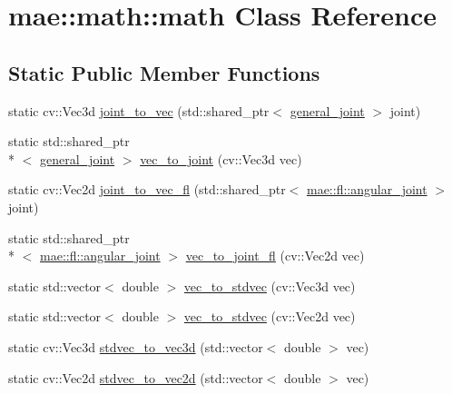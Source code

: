 \hypertarget{classmae_1_1math_1_1math}{\section{mae\-:\-:math\-:\-:math Class Reference}
\label{classmae_1_1math_1_1math}
}
\subsection*{Static Public Member Functions}
\begin{DoxyCompactItemize}
\item 
static cv\-::\-Vec3d \hyperlink{classmae_1_1math_1_1math_a69d06a0e584bf1d872d26a4fd2db37f0}{joint\-\_\-to\-\_\-vec} (std\-::shared\-\_\-ptr$<$ \hyperlink{classmae_1_1general__joint}{general\-\_\-joint} $>$ joint)
\item 
static std\-::shared\-\_\-ptr\\*
$<$ \hyperlink{classmae_1_1general__joint}{general\-\_\-joint} $>$ \hyperlink{classmae_1_1math_1_1math_a8a1e0a8ab6f487a3fa8ee69af6fc798b}{vec\-\_\-to\-\_\-joint} (cv\-::\-Vec3d vec)
\item 
static cv\-::\-Vec2d \hyperlink{classmae_1_1math_1_1math_a9c06acbeefcc43a217df33d0dd4f1611}{joint\-\_\-to\-\_\-vec\-\_\-fl} (std\-::shared\-\_\-ptr$<$ \hyperlink{classmae_1_1fl_1_1angular__joint}{mae\-::fl\-::angular\-\_\-joint} $>$ joint)
\item 
static std\-::shared\-\_\-ptr\\*
$<$ \hyperlink{classmae_1_1fl_1_1angular__joint}{mae\-::fl\-::angular\-\_\-joint} $>$ \hyperlink{classmae_1_1math_1_1math_aa56f27d38991dd723a80e61901c74c01}{vec\-\_\-to\-\_\-joint\-\_\-fl} (cv\-::\-Vec2d vec)
\item 
static std\-::vector$<$ double $>$ \hyperlink{classmae_1_1math_1_1math_a812f46b202aebc286d6c59adf0b2308c}{vec\-\_\-to\-\_\-stdvec} (cv\-::\-Vec3d vec)
\item 
static std\-::vector$<$ double $>$ \hyperlink{classmae_1_1math_1_1math_ab2267cd4acb9934ea4b429dd58feab72}{vec\-\_\-to\-\_\-stdvec} (cv\-::\-Vec2d vec)
\item 
static cv\-::\-Vec3d \hyperlink{classmae_1_1math_1_1math_ac800a14f5226f4d88cd7db0efe474a16}{stdvec\-\_\-to\-\_\-vec3d} (std\-::vector$<$ double $>$ vec)
\item 
static cv\-::\-Vec2d \hyperlink{classmae_1_1math_1_1math_a644e19eb8d84e63170bc9c7650e105e9}{stdvec\-\_\-to\-\_\-vec2d} (std\-::vector$<$ double $>$ vec)
\item 

\end{DoxyCompactItemize}
